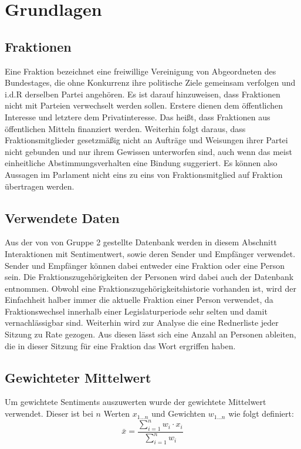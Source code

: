 \section{Grundlagen}\label{sec:06_02_grundlagen}
\subsection{Fraktionen}
Eine Fraktion bezeichnet eine freiwillige Vereinigung von Abgeordneten des Bundestages, die ohne Konkurrenz ihre politische Ziele gemeinsam verfolgen und i.d.R derselben Partei angehören. Es ist darauf hinzuweisen, dass Fraktionen nicht mit Parteien verwechselt werden sollen. Erstere dienen dem öffentlichen Interesse und letztere dem Privatinteresse. Das heißt, dass Fraktionen aus öffentlichen Mitteln finanziert werden. Weiterhin folgt daraus, dass Fraktionsmitglieder gesetzmäßig nicht an 
Aufträge und Weisungen ihrer Partei nicht gebunden und nur ihrem Gewissen unterworfen sind, auch wenn das meist einheitliche Abstimmungsverhalten eine Bindung suggeriert. Es können also Aussagen im Parlament nicht eins zu eins von Fraktionsmitglied auf Fraktion übertragen werden.
\subsection{Verwendete Daten}
Aus der von von Gruppe 2 gestellte Datenbank werden in diesem Abschnitt Interaktionen mit Sentimentwert, sowie deren Sender und Empfänger verwendet. Sender und Empfänger können dabei entweder eine Fraktion oder eine Person sein. Die Fraktionszugehörigkeiten der Personen wird dabei auch der Datenbank entnommen. Obwohl eine Fraktionszugehörigkeitshistorie vorhanden ist, wird der Einfachheit halber immer die aktuelle Fraktion einer Person verwendet, da Fraktionswechsel innerhalb einer Legislaturperiode sehr selten und damit vernachlässigbar sind. Weiterhin wird zur Analyse die eine Rednerliste jeder Sitzung zu Rate gezogen. Aus diesen lässt sich eine Anzahl an Personen ableiten, die in dieser Sitzung für eine Fraktion das Wort ergriffen haben.

\subsection{Gewichteter Mittelwert}
Um gewichtete Sentiments auszuwerten wurde der gewichtete Mittelwert verwendet. Dieser ist bei $n$ Werten $x_{1...n}$ und Gewichten $w_{1...n}$ wie folgt definiert:
$$\bar{x}=\frac{\sum_{i=1}^{n} w_{i} \cdot x_{i}}{\sum_{i=1}^{n} w_{i}}$$